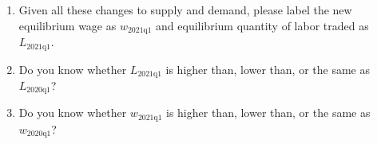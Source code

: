 \documentclass{assignment}
\begin{document}
\begin{enumerate}
\item Given all these changes to supply and demand, please label the new equilibrium wage as $w_\text{2021q1}$ and equilibrium quantity of labor traded as $L_\text{2021q1}$.

\item Do you know whether $L_\text{2021q1}$ is higher than, lower than, or the same as $L_\text{2020q1}$?

\vfill

\item Do you know whether $w_\text{2021q1}$ is higher than, lower than, or the same as $w_\text{2020q1}$?

\vfill

\end{enumerate}
\end{document}
